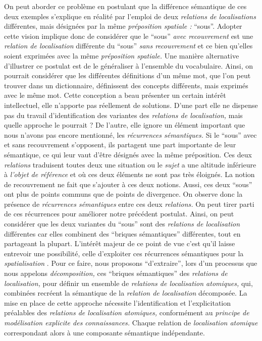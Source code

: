On peut aborder ce problème en postulant que la différence sémantique
de ces deux exemples s'explique en réalité par l’emploi de deux
\emph{relations de localisations} différentes, mais désignées par la
même \emph{préposition spatiale :} \enquote{sous}. Adopter cette
vision implique donc de considérer que le \enquote{sous} \emph{avec
  recouvrement} est une \emph{relation de localisation} différente du
\enquote{sous} \emph{sans recouvrement} et ce bien qu'elles soient
exprimées avec la même \emph{préposition spatiale.} Une manière
alternative d'illustrer ce postulat est de le généraliser à l'ensemble
du vocabulaire. Ainsi, on pourrait considérer que les différentes
définitions d'un même mot, que l'on peut trouver dans un dictionnaire,
définissent des concepts différents, mais exprimés avec le même
mot. Cette conception a beau présenter un certain intérêt
intellectuel, elle n'apporte pas réellement de solutions. D'une part
elle ne dispense pas du travail d’identification des variantes des
\emph{relations de localisation,} mais quelle approche le pourrait ?
De l'autre, elle ignore un élément important que nous n'avons pas
encore mentionné, les \emph{récurrences sémantiques.} Si le
\enquote{sous} avec et sans recouvrement s'opposent, ils partagent une
part importante de leur sémantique, ce qui leur vaut d'être désignés
avec la même préposition. Ces deux \emph{relations} traduisent toutes
deux une situation ou le \emph{sujet} a une altitude inférieure à
\emph{l'objet de référence} et où ces deux éléments ne sont pas très
éloignés. La notion de recouvrement ne fait que s'ajouter à ces deux
notions. Aussi, ces deux \enquote{sous} ont plus de points communs que
de points de divergence. On observe donc la présence de
\emph{récurrences sémantiques} entre ces deux \emph{relations.} On
peut tirer parti de ces récurrences pour améliorer notre précédent
postulat. Ainsi, on peut considérer que les deux variantes du
\enquote{sous} sont des \emph{relations de localisation} différentes
car elles combinent des \enquote{briques sémantiques} différentes,
tout en partageant la plupart. L’intérêt majeur de ce point de vue
c'est qu'il laisse entrevoir une possibilité, celle d'exploiter ces
récurrences sémantiques pour la \emph{spatialisation}
\autocite{Bunel2019a}. Pour ce faire, nous proposons
\enquote{d'extraire}, lors d'un processus que nous appelons
\emph{décomposition,} ces \enquote{briques sémantiques} des
\emph{relations de localisation,} pour définir un ensemble de
\emph{relations de localisation atomiques,} qui, combinées recréent la
sémantique de la \emph{relation de localisation} décomposée. La mise
en place de cette approche nécessite l'identification et
l'explicitation préalables des \emph{relations de localisation
  atomiques,} conformément au \emph{principe de modélisation explicite
  des connaissances.} Chaque relation de \emph{localisation atomique}
correspondant alors à une composante sémantique indépendante.

